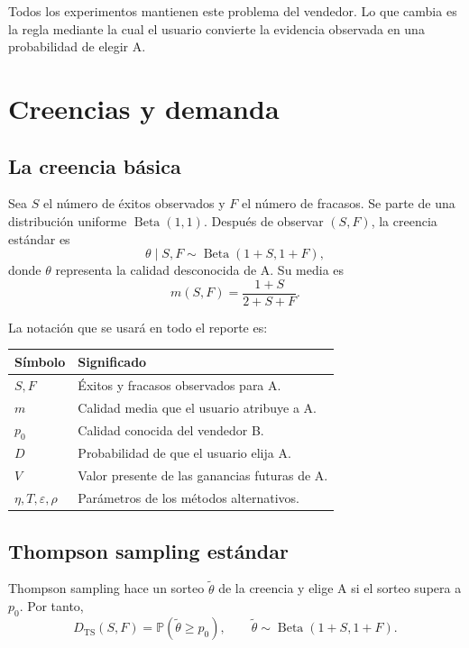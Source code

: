 \documentclass[11pt]{article}
\newcommand{\Prob}{\mathbb{P}}
\newcommand{\BetaDist}{\operatorname{Beta}}
\begin{document}
Todos los experimentos mantienen este problema del vendedor. Lo que cambia es
la regla mediante la cual el usuario convierte la evidencia observada en una
probabilidad de elegir A.

\section{Creencias y demanda}

\subsection{La creencia básica}

Sea $S$ el número de éxitos observados y $F$ el número de fracasos. Se parte de
una distribución uniforme $\BetaDist(1,1)$. Después de observar $(S,F)$, la
creencia estándar es
\begin{equation}
  \theta\mid S,F \sim \BetaDist(1+S,1+F),
\end{equation}
donde $\theta$ representa la calidad desconocida de A. Su media es
\begin{equation}
  m(S,F)=\frac{1+S}{2+S+F}.
\end{equation}

La notación que se usará en todo el reporte es:

\begin{center}
\begin{tabular}{>{\centering\arraybackslash}p{2.2cm}p{10.4cm}}
\toprule
Símbolo & Significado \\
\midrule
$S,F$ & Éxitos y fracasos observados para A. \\
$m$ & Calidad media que el usuario atribuye a A. \\
$p_0$ & Calidad conocida del vendedor B. \\
$D$ & Probabilidad de que el usuario elija A. \\
$V$ & Valor presente de las ganancias futuras de A. \\
$\eta,T,\varepsilon,\rho$ & Parámetros de los métodos alternativos. \\
\bottomrule
\end{tabular}
\end{center}

\subsection{Thompson sampling estándar}

Thompson sampling hace un sorteo $\widetilde\theta$ de la creencia y elige A
si el sorteo supera a $p_0$. Por tanto,
\begin{equation}
  D_{\mathrm{TS}}(S,F)
  =\Prob\!\left(\widetilde\theta\ge p_0\right),
  \qquad
  \widetilde\theta\sim\BetaDist(1+S,1+F).
\end{equation}
\end{document}
